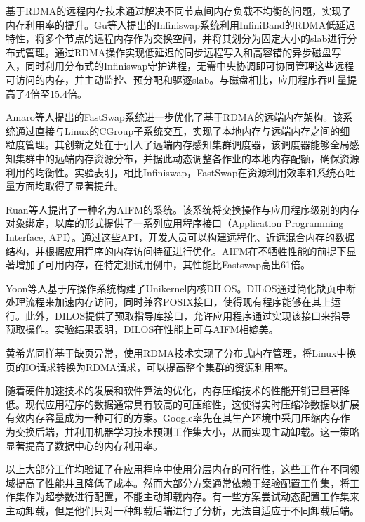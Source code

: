 基于RDMA的远程内存技术通过解决不同节点间内存负载不均衡的问题，实现了内存利用率的提升。Gu等人提出的Infiniswap系统利用InfiniBand的RDMA低延迟特性，将多个节点的远程内存作为交换空间，并将其划分为固定大小的slab进行分布式管理。通过RDMA操作实现低延迟的同步远程写入和高容错的异步磁盘写入，同时利用分布式的Infiniswap守护进程，无需中央协调即可协同管理这些远程可访问的内存，并主动监控、预分配和驱逐slab。与磁盘相比，应用程序吞吐量提高了4倍至15.4倍。

Amaro等人提出的FastSwap系统进一步优化了基于RDMA的远端内存架构。该系统通过直接与Linux的CGroup子系统交互，实现了本地内存与远端内存之间的细粒度管理。其创新之处在于引入了远端内存感知集群调度器，该调度器能够全局感知集群中的远端内存资源分布，并据此动态调整各作业的本地内存配额，确保资源利用的均衡性。实验表明，相比Infiniswap，FastSwap在资源利用效率和系统吞吐量方面均取得了显著提升。

Ruan等人提出了一种名为AIFM的系统。该系统将交换操作与应用程序级别的内存对象绑定，以库的形式提供了一系列应用程序接口（Application Programming Interface, API）。通过这些API，开发人员可以构建远程化、近远混合内存的数据结构，并根据应用程序的内存访问特征进行优化。AIFM在不牺牲性能的前提下显著增加了可用内存，在特定测试用例中，其性能比Fastswap高出61倍。

Yoon等人基于库操作系统构建了Unikernel内核DILOS。DILOS通过简化缺页中断处理流程来加速内存访问，同时兼容POSIX接口，使得现有程序能够在其上运行。此外，DILOS提供了预取指导库接口，允许应用程序通过实现该接口来指导预取操作。实验结果表明，DILOS在性能上可与AIFM相媲美。

黄希光同样基于缺页异常，使用RDMA技术实现了分布式内存管理，将Linux中换页的IO请求转换为RDMA请求，可以提高整个集群的资源利用率。

随着硬件加速技术的发展和软件算法的优化，内存压缩技术的性能开销已显著降低。现代应用程序的数据通常具有较高的可压缩性，这使得实时压缩冷数据以扩展有效内存容量成为一种可行的方案。Google率先在其生产环境中采用压缩内存作为交换后端，并利用机器学习技术预测工作集大小，从而实现主动卸载。这一策略显著提高了数据中心的内存利用率。

以上大部分工作均验证了在应用程序中使用分层内存的可行性，这些工作在不同领域提高了性能并且降低了成本。然而大部分方案通常依赖于经验配置工作集，将工作集作为超参数进行配置，不能主动卸载内存。有一些方案尝试动态配置工作集来主动卸载，但是他们只对一种卸载后端进行了分析，无法自适应于不同卸载后端。

